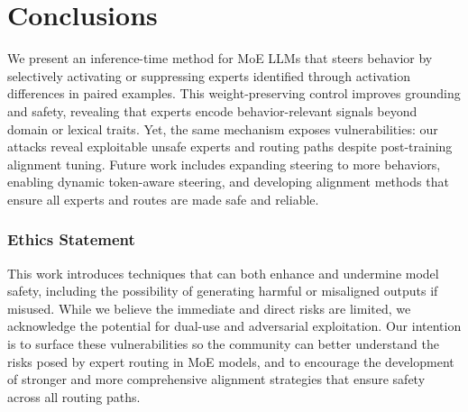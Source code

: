 \documentclass{article} %
\begin{document}
\section{Conclusions}
We present an inference-time method for MoE LLMs that steers behavior by selectively activating or suppressing experts identified through activation differences in paired examples. This weight-preserving control improves grounding and safety, revealing that experts encode behavior-relevant signals beyond domain or lexical traits. Yet, the same mechanism exposes vulnerabilities: our attacks reveal exploitable unsafe experts and routing paths despite post-training alignment tuning.
Future work includes expanding steering to more behaviors, enabling dynamic token-aware steering, and developing alignment methods that ensure all experts and routes are made safe and reliable.




\newpage

\subsubsection*{Ethics Statement}
This work introduces techniques that can both enhance and undermine model safety, including the possibility of generating harmful or misaligned outputs if misused. While we believe the immediate and direct risks are limited, we acknowledge the potential for dual-use and adversarial exploitation. Our intention is to surface these vulnerabilities so the community can better understand the risks posed by expert routing in MoE models, and to encourage the development of stronger and more comprehensive alignment strategies that ensure safety across all routing paths.
\end{document}
